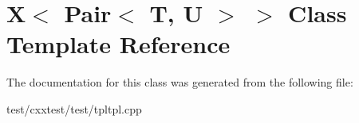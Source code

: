 \hypertarget{classX_3_01Pair_3_01T_00_01U_01_4_01_4}{\section{X$<$ Pair$<$ T, U $>$ $>$ Class Template Reference}
\label{classX_3_01Pair_3_01T_00_01U_01_4_01_4}
}


The documentation for this class was generated from the following file\-:\begin{DoxyCompactItemize}
\item 
test/cxxtest/test/tpltpl.\-cpp\end{DoxyCompactItemize}
